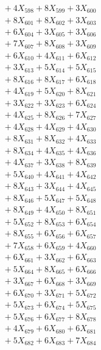 \documentclass[a4paper,10pt]{article}
\begin{document}
{\begin{align}
&\;  + 4 X_{598} + 8 X_{599} + 3 X_{600} \\[0.3ex]
&\;  + 8 X_{601} + 8 X_{602} + 3 X_{603} \\[0.3ex]
&\;  + 6 X_{604} + 3 X_{605} + 3 X_{606} \\[0.3ex]
&\;  + 7 X_{607} + 8 X_{608} + 3 X_{609} \\[0.5ex]\allowbreak
&\;  + 6 X_{610} + 4 X_{611} + 6 X_{612} \\[0.3ex]
&\;  + 3 X_{613} + 5 X_{614} + 5 X_{615} \\[0.3ex]
&\;  + 8 X_{616} + 8 X_{617} + 6 X_{618} \\[0.3ex]
&\;  + 4 X_{619} + 5 X_{620} + 8 X_{621} \\[0.3ex]
&\;  + 3 X_{622} + 3 X_{623} + 6 X_{624} \\[0.3ex]
&\;  + 4 X_{625} + 8 X_{626} + 7 X_{627} \\[0.3ex]
&\;  + 4 X_{628} + 4 X_{629} + 4 X_{630} \\[0.3ex]
&\;  + 8 X_{631} + 8 X_{632} + 4 X_{633} \\[0.3ex]
&\;  + 8 X_{634} + 4 X_{635} + 4 X_{636} \\[0.3ex]
&\;  + 4 X_{637} + 3 X_{638} + 8 X_{639} \\[0.5ex]\allowbreak
&\;  + 5 X_{640} + 4 X_{641} + 4 X_{642} \\[0.3ex]
&\;  + 8 X_{643} + 3 X_{644} + 4 X_{645} \\[0.3ex]
&\;  + 8 X_{646} + 5 X_{647} + 5 X_{648} \\[0.3ex]
&\;  + 8 X_{649} + 4 X_{650} + 8 X_{651} \\[0.3ex]
&\;  + 5 X_{652} + 8 X_{653} + 6 X_{654} \\[0.3ex]
&\;  + 8 X_{655} + 6 X_{656} + 6 X_{657} \\[0.3ex]
&\;  + 7 X_{658} + 6 X_{659} + 4 X_{660} \\[0.3ex]
&\;  + 6 X_{661} + 3 X_{662} + 6 X_{663} \\[0.3ex]
&\;  + 5 X_{664} + 8 X_{665} + 6 X_{666} \\[0.3ex]
&\;  + 3 X_{667} + 6 X_{668} + 3 X_{669} \\[0.5ex]\allowbreak
&\;  + 6 X_{670} + 3 X_{671} + 5 X_{672} \\[0.3ex]
&\;  + 5 X_{673} + 6 X_{674} + 5 X_{675} \\[0.3ex]
&\;  + 5 X_{676} + 6 X_{677} + 8 X_{678} \\[0.3ex]
&\;  + 4 X_{679} + 6 X_{680} + 6 X_{681} \\[0.3ex]
&\;  + 5 X_{682} + 6 X_{683} + 7 X_{684} \\[0.3ex]

\end{align}}
\end{document}
